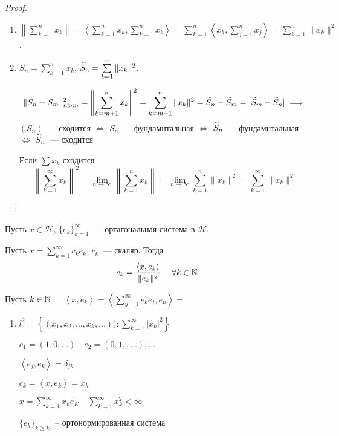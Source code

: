 \begin{proof}
    \begin{enumerate}
        \item $\left\| \sum_{k=1}^n x_k \right\| = \left< \sum_{k=1}^n x_k, \sum_{k=1}^n x_k \right> = \sum_{k=1}^n \left< x_k, \sum_{j=1}^n x_j\right> = \sum_{k=1}^n \| x_k\|^2$.
        \item $S_n = \sum_{k=1}^n x_k$, $\tl{S}_n = \sum_{k=1}^n \|x_k \| ^2$.

        \[ \|S_n - S_m\|_{n > m}^2 = \left\| \sum_{k = m + 1}^n x_k  \right\|^2 = \sum_{k = m + 1}^n \| x_k\|^2 = \tl S_n - \tl S_m = | \tl S _m - \tl S_n| \implies  \]
        $(S_n)$~--- сходится  $\iff$ $ S _n$~--- фундамнтальная $\iff$ $\widetilde{S} _n$~--- фундамнтальная $\iff$ $\widetilde{S}_n$~--- сходится

        Если $\sum x_k$ сходится
        \[ \left\| \sum_{k=1}^\infty x_k  \right\|^2 = \lim_{n\to\infty} \left\| \sum_{k=1}^n x_k \right\| = \lim_{n \to \infty } \sum_{k=1}^n \| x_k \| ^2 =\sum_{k=1}^\infty \|x_k\|^2 \]
    \end{enumerate}
\end{proof}

Пусть  $x \in \mathcal{H}$, $\{ e_k\} _{k=1}^\infty$~--- ортагональная система в $\mathcal{H}$.

Пусть $x = \sum_{k = 1}^\infty c_k e_k$, $c_k$~--- скаляр. Тогда
\[c_k = \dfrac{\left< x, e_k \right>}{\|e_k\| ^2}~~~~ \forall k \in \mathbb{N}
    \]

Пусть $k \in \mathbb{N}$~~~$\left< x, e_k \right> = \left< \sum_{y = 1}^\infty e_k e_j, e_n \right>  =$

\begin{example}
    \begin{enumerate}
        \item $l^2 = \left\{ \left( x_1, x_2, \ldots, x_k, \ldots \right) ) : \sum_{k=1}^{\infty } |x_k|^2  \right\}$

        $e_1 = (1,  0, \ldots)\quad e_2 = (0, 1, , \ldots), \ldots$

        $\left<e_j, e_k \right> = \delta_{jk}$

        $c_k = \left<x, e_k \right> = x_k$

        $x = \sum_{k=1}^{\infty } x_ke_K\quad \sum_{k=1}^{\infty } x_k^2 <\infty  $

        $\{e_k\}_{k\geqslant k_0}$ -- ортонормированная система
    \end{enumerate}
\end{example}

